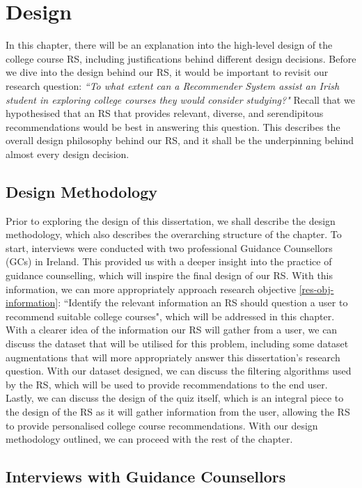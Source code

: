 \chapter{Design}
\label{chap:design}

In this chapter, there will be an explanation into the high-level design of the college course RS,
including justifications behind different design decisions. 
Before we dive into the design behind our RS, it would be important to revisit our research question: 
\emph{``To what extent can a Recommender System assist an Irish student in exploring college courses they would consider studying?"}
Recall that we hypothesised that an RS that provides relevant, diverse, and serendipitous recommendations
would be best in answering this question.
This describes the overall design philosophy behind our RS, and it shall be the 
underpinning behind almost every design decision.

\section{Design Methodology}

Prior to exploring the design of this dissertation, we shall describe the design methodology, which also describes 
the overarching structure of the chapter.
To start, interviews were conducted with two professional Guidance Counsellors (GCs) in Ireland.
This provided us with a deeper insight into the practice of guidance counselling,
which will inspire the final design of our RS.
With this information, we can more appropriately approach research objective \ref{res-obj-information}:
``Identify the relevant information an RS should question a user to recommend suitable college courses",
which will be addressed in this chapter.
With a clearer idea of the information our RS will gather from a user,
we can discuss the dataset that will be utilised for this problem,
including some dataset augmentations that will more appropriately answer this dissertation's research question.
With our dataset designed, we can discuss the filtering algorithms used by the RS,
which will be used to provide recommendations to the end user.
Lastly, we can discuss the design of the quiz itself, which is an integral piece to the design 
of the RS as it will gather information from the user,
allowing the RS to provide personalised college course recommendations.
With our design methodology outlined, we can proceed with the rest of the chapter.

\section{Interviews with Guidance Counsellors}
\label{sec:interviews-gc}

